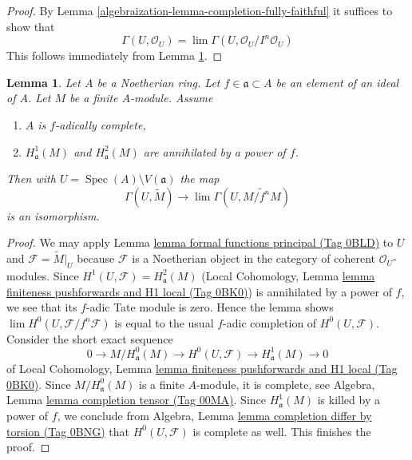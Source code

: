 \documentclass{amsart}
\theoremstyle{plain}
\newtheorem{lemma}[subsection]{Lemma}
\theoremstyle{definition}
\theoremstyle{remark}
\numberwithin{equation}{subsection}
\def\lim{\mathop{\mathrm{lim}}\nolimits}
\def\Spec{\mathop{\mathrm{Spec}}}
\begin{document}
\begin{proof}
By Lemma \ref{algebraization-lemma-completion-fully-faithful}
it suffices to show that
$$
\Gamma(U, \mathcal{O}_U) =
\lim \Gamma(U, \mathcal{O}_U/I^n\mathcal{O}_U)
$$
This follows immediately from
Lemma \ref{algebraization-lemma-alternative-H0}.
\end{proof}


\begin{lemma}
\label{algebraization-lemma-alternative-H0}
Let $A$ be a Noetherian ring. Let $f \in \mathfrak a \subset A$
be an element of an ideal of $A$. Let $M$ be a finite $A$-module.
Assume
\begin{enumerate}
\item $A$ is $f$-adically complete,
\item $H^1_\mathfrak a(M)$ and $H^2_\mathfrak a(M)$ are
annihilated by a power of $f$.
\end{enumerate}
Then with $U = \Spec(A) \setminus V(\mathfrak a)$ the map
$$
\Gamma(U, \widetilde{M})
\longrightarrow
\lim \Gamma(U, \widetilde{M/f^nM})
$$
is an isomorphism.
\end{lemma}

\begin{proof}
We may apply Lemma \href{https://stacks.math.columbia.edu/tag/0BLD}{lemma formal functions principal (Tag 0BLD)} to $U$ and
$\mathcal{F} = \widetilde{M}|_U$ because $\mathcal{F}$ is a Noetherian object in
the category of coherent $\mathcal{O}_U$-modules.
Since $H^1(U, \mathcal{F}) = H^2_\mathfrak a(M)$
(Local Cohomology, Lemma
\href{https://stacks.math.columbia.edu/tag/0BK0}{lemma finiteness pushforwards and H1 local (Tag 0BK0)})
is annihilated by a power of $f$, we see that
its $f$-adic Tate module is zero.
Hence the lemma shows $\lim H^0(U, \mathcal{F}/f^n \mathcal{F})$
is equal to the usual $f$-adic completion of $H^0(U, \mathcal{F})$.
Consider the short exact sequence
$$
0 \to M/H^0_\mathfrak a(M) \to H^0(U, \mathcal{F}) \to H^1_\mathfrak a(M) \to 0
$$
of Local Cohomology, Lemma
\href{https://stacks.math.columbia.edu/tag/0BK0}{lemma finiteness pushforwards and H1 local (Tag 0BK0)}.
Since $M/H^0_\mathfrak a(M)$ is a finite $A$-module, it is
complete, see Algebra, Lemma \href{https://stacks.math.columbia.edu/tag/00MA}{lemma completion tensor (Tag 00MA)}.
Since $H^1_\mathfrak a(M)$ is killed by a power of $f$, we conclude
from Algebra, Lemma \href{https://stacks.math.columbia.edu/tag/0BNG}{lemma completion differ by torsion (Tag 0BNG)}
that $H^0(U, \mathcal{F})$ is complete as well. This finishes the proof.
\end{proof}
\end{document}
